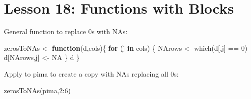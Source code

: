 \documentclass[
]{article}
\newenvironment{Shaded}{\begin{snugshade}}{\end{snugshade}}
\newcommand{\ConstantTok}[1]{\textcolor[rgb]{0.00,0.00,0.00}{#1}}
\newcommand{\ControlFlowTok}[1]{\textcolor[rgb]{0.13,0.29,0.53}{\textbf{#1}}}
\newcommand{\DecValTok}[1]{\textcolor[rgb]{0.00,0.00,0.81}{#1}}
\newcommand{\FunctionTok}[1]{\textcolor[rgb]{0.00,0.00,0.00}{#1}}
\newcommand{\NormalTok}[1]{#1}
\newcommand{\OtherTok}[1]{\textcolor[rgb]{0.56,0.35,0.01}{#1}}
\newcommand{\SpecialCharTok}[1]{\textcolor[rgb]{0.00,0.00,0.00}{#1}}
\begin{document}
\hypertarget{lesson-18-functions-with-blocks}{%
\section{Lesson 18: Functions with
Blocks}\label{lesson-18-functions-with-blocks}}

General function to replace 0s with NAs:

\begin{Shaded}
\begin{Highlighting}[]
\NormalTok{zerosToNAs }\OtherTok{\textless{}{-}} \ControlFlowTok{function}\NormalTok{(d,cols)\{}
   \ControlFlowTok{for}\NormalTok{ (j }\ControlFlowTok{in}\NormalTok{ cols) \{}
\NormalTok{      NArows }\OtherTok{\textless{}{-}} \FunctionTok{which}\NormalTok{(d[,j] }\SpecialCharTok{==} \DecValTok{0}\NormalTok{)}
\NormalTok{      d[NArows,j] }\OtherTok{\textless{}{-}} \ConstantTok{NA}
\NormalTok{   \}}
\NormalTok{   d}
\NormalTok{\}}
\end{Highlighting}
\end{Shaded}

Apply to pima to create a copy with NAs replacing all 0s:

\begin{Shaded}
\begin{Highlighting}[]
\FunctionTok{zerosToNAs}\NormalTok{(pima,}\DecValTok{2}\SpecialCharTok{:}\DecValTok{6}\NormalTok{)}
\end{Highlighting}
\end{Shaded}
\end{document}
